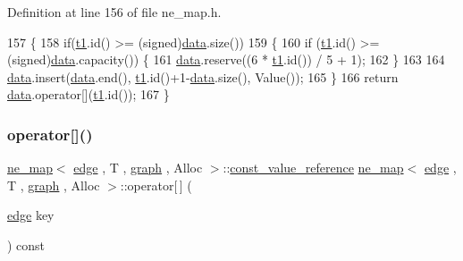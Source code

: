Definition at line 156 of file ne\+\_\+map.\+h.


\begin{DoxyCode}
157 \{
158     \textcolor{keywordflow}{if}(\mbox{\hyperlink{gml2nestedsql_8cpp_a214bd1a0500f5739ce581a8bcffb518a}{t1}}.id() >= (signed)\mbox{\hyperlink{classne__map_af73307678e05a9c24c084d98b267afa8}{data}}.size())
159     \{
160     \textcolor{keywordflow}{if} (\mbox{\hyperlink{gml2nestedsql_8cpp_a214bd1a0500f5739ce581a8bcffb518a}{t1}}.id() >= (signed)\mbox{\hyperlink{classne__map_af73307678e05a9c24c084d98b267afa8}{data}}.capacity()) \{
161         \mbox{\hyperlink{classne__map_af73307678e05a9c24c084d98b267afa8}{data}}.reserve((6 * \mbox{\hyperlink{gml2nestedsql_8cpp_a214bd1a0500f5739ce581a8bcffb518a}{t1}}.id()) / 5 + 1);
162     \}
163 
164     \mbox{\hyperlink{classne__map_af73307678e05a9c24c084d98b267afa8}{data}}.insert(\mbox{\hyperlink{classne__map_af73307678e05a9c24c084d98b267afa8}{data}}.end(), \mbox{\hyperlink{gml2nestedsql_8cpp_a214bd1a0500f5739ce581a8bcffb518a}{t1}}.id()+1-\mbox{\hyperlink{classne__map_af73307678e05a9c24c084d98b267afa8}{data}}.size(), Value());
165     \}
166     \textcolor{keywordflow}{return} \mbox{\hyperlink{classne__map_af73307678e05a9c24c084d98b267afa8}{data}}.operator[](\mbox{\hyperlink{gml2nestedsql_8cpp_a214bd1a0500f5739ce581a8bcffb518a}{t1}}.id());
167 \}
\end{DoxyCode}
\mbox{\label{classne__map_ad8d23cc924963ddff8267e625dcbffc6}} 
\subsubsection{\texorpdfstring{operator[]()}{operator[]()}\hspace{0.1cm}{\footnotesize\ttfamily [2/2]}}
{\footnotesize\ttfamily \mbox{\hyperlink{classne__map}{ne\+\_\+map}}$<$ \mbox{\hyperlink{classedge}{edge}} , T , \mbox{\hyperlink{classgraph}{graph}} , Alloc $>$\+::\mbox{\hyperlink{classne__map_ad2be1a01de53940aee1282ec0e34f0f7}{const\+\_\+value\+\_\+reference}} \mbox{\hyperlink{classne__map}{ne\+\_\+map}}$<$ \mbox{\hyperlink{classedge}{edge}} , T , \mbox{\hyperlink{classgraph}{graph}} , Alloc $>$\+::operator\mbox{[}$\,$\mbox{]} (\begin{DoxyParamCaption}\item[{\mbox{\hyperlink{classedge}{edge}}}]{key }\end{DoxyParamCaption}) const\hspace{0.3cm}{\ttfamily [inherited]}}

